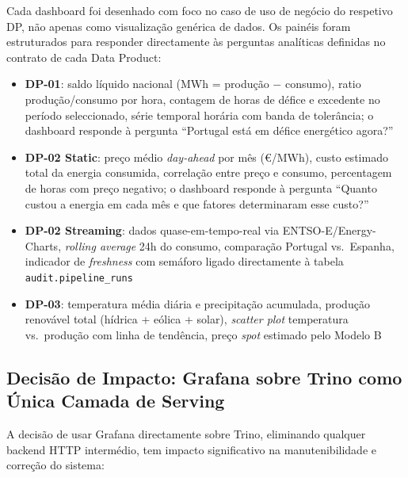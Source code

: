 \documentclass[11pt,a4paper]{article}
\begin{document}
Cada dashboard foi desenhado com foco no caso de uso de negócio do respetivo DP, não apenas como visualização genérica de dados. Os painéis foram estruturados para responder directamente às perguntas analíticas definidas no contrato de cada Data Product:

\begin{itemize}[leftmargin=*,noitemsep]
  \item \textbf{DP-01}: saldo líquido nacional (MWh = produção $-$ consumo), ratio produção/consumo por hora, contagem de horas de défice e excedente no período seleccionado, série temporal horária com banda de tolerância; o dashboard responde à pergunta ``Portugal está em défice energético agora?''
  \item \textbf{DP-02 Static}: preço médio \textit{day-ahead} por mês (€/MWh), custo estimado total da energia consumida, correlação entre preço e consumo, percentagem de horas com preço negativo; o dashboard responde à pergunta ``Quanto custou a energia em cada mês e que fatores determinaram esse custo?''
  \item \textbf{DP-02 Streaming}: dados quase-em-tempo-real via ENTSO-E/Energy-Charts, \textit{rolling average} 24h do consumo, comparação Portugal vs.\ Espanha, indicador de \textit{freshness} com semáforo ligado directamente à tabela \texttt{audit.pipeline\_runs}
  \item \textbf{DP-03}: temperatura média diária e precipitação acumulada, produção renovável total (hídrica + eólica + solar), \textit{scatter plot} temperatura vs.\ produção com linha de tendência, preço \textit{spot} estimado pelo Modelo B
\end{itemize}

\subsection{Decisão de Impacto: Grafana sobre Trino como Única Camada de Serving}

A decisão de usar Grafana directamente sobre Trino, eliminando qualquer backend HTTP intermédio, tem impacto significativo na manutenibilidade e correção do sistema:
\end{document}
